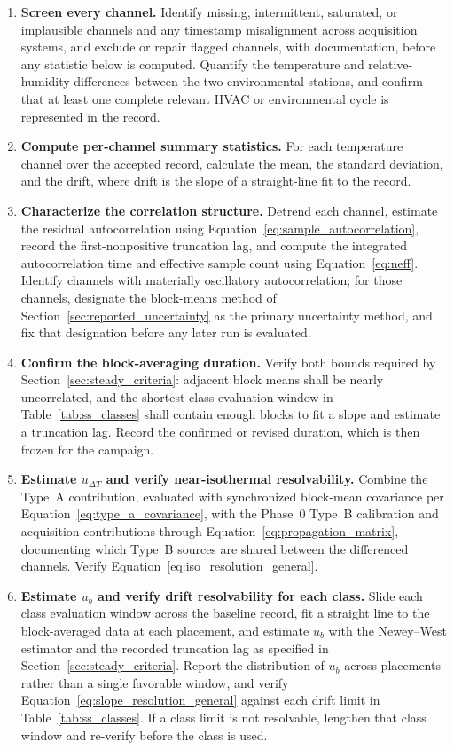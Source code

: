 \documentclass[11pt]{article}
\begin{document}
\begin{enumerate}
    \item \textbf{Screen every channel.} Identify missing, intermittent, saturated, or implausible channels and any timestamp misalignment across acquisition systems, and exclude or repair flagged channels, with documentation, before any statistic below is computed. Quantify the temperature and relative-humidity differences between the two environmental stations, and confirm that at least one complete relevant HVAC or environmental cycle is represented in the record.

    \item \textbf{Compute per-channel summary statistics.} For each temperature channel over the accepted record, calculate the mean, the standard deviation, and the drift, where drift is the slope of a straight-line fit to the record.

    \item \textbf{Characterize the correlation structure.} Detrend each channel, estimate the residual autocorrelation using Equation~\eqref{eq:sample_autocorrelation}, record the first-nonpositive truncation lag, and compute the integrated autocorrelation time and effective sample count using Equation~\eqref{eq:neff}. Identify channels with materially oscillatory autocorrelation; for those channels, designate the block-means method of Section~\ref{sec:reported_uncertainty} as the primary uncertainty method, and fix that designation before any later run is evaluated.

    \item \textbf{Confirm the block-averaging duration.} Verify both bounds required by Section~\ref{sec:steady_criteria}: adjacent block means shall be nearly uncorrelated, and the shortest class evaluation window in Table~\ref{tab:ss_classes} shall contain enough blocks to fit a slope and estimate a truncation lag. Record the confirmed or revised duration, which is then frozen for the campaign.

    \item \textbf{Estimate $u_{\Delta T}$ and verify near-isothermal resolvability.} Combine the Type~A contribution, evaluated with synchronized block-mean covariance per Equation~\eqref{eq:type_a_covariance}, with the Phase~0 Type~B calibration and acquisition contributions through Equation~\eqref{eq:propagation_matrix}, documenting which Type~B sources are shared between the differenced channels. Verify Equation~\eqref{eq:iso_resolution_general}.

    \item \textbf{Estimate $u_b$ and verify drift resolvability for each class.} Slide each class evaluation window across the baseline record, fit a straight line to the block-averaged data at each placement, and estimate $u_b$ with the Newey--West estimator and the recorded truncation lag as specified in Section~\ref{sec:steady_criteria}. Report the distribution of $u_b$ across placements rather than a single favorable window, and verify Equation~\eqref{eq:slope_resolution_general} against each drift limit in Table~\ref{tab:ss_classes}. If a class limit is not resolvable, lengthen that class window and re-verify before the class is used.


\end{enumerate}
\end{document}
